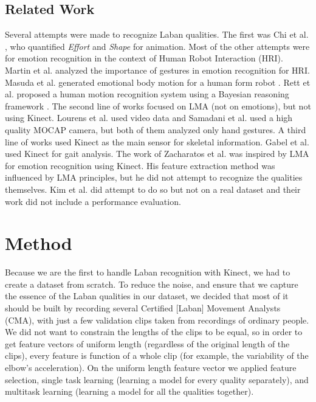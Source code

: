 \documentclass[11pt,twocolumn,varwidth=true,a4paper,fleqn]{article}
\begin{document}
\subsection{Related Work}
Several attempts were made to recognize Laban qualities. The first was Chi et al. \cite{chi2000emote}, who quantified \textit{Effort} and \textit{Shape} for animation. Most of the other attempts were for emotion recognition in the context of Human Robot Interaction (HRI). Martin et al. \cite{martin} analyzed the importance of gestures in emotion recognition for HRI. Masuda et al. generated emotional body motion for a human 
form robot \cite{Masuda}. Rett et al. proposed a human motion recognition 
system using a Bayesian reasoning framework \cite{Rett}. The second line of works focused on LMA (not on emotions), but not using Kinect. Lourens et al. \cite{lourens2010communicating} used video data and Samadani et al.
\cite{samadani2013laban} used a high quality MOCAP camera, but both of them
analyzed only hand gestures. A third line of works used Kinect as the main
sensor for skeletal information. Gabel et al.
\cite{gabel2012full} used Kinect for gait analysis. The work of
Zacharatos et al. \cite{Zacharatos} was inspired by LMA for emotion recognition using Kinect. His feature extraction method was influenced by LMA principles, but he did not attempt to recognize the qualities themselves. Kim et al. \cite{kim} did attempt to do so but not on a real dataset and their work did not include a performance evaluation.

\section{Method}
Because we are the first to handle Laban recognition with
Kinect, we had to create a dataset from scratch. To reduce the noise, and ensure that we capture the essence of the Laban qualities in our dataset, we decided that most of it should be built by recording several Certified [Laban] Movement Analysts (CMA), with just a few validation clips taken from recordings of ordinary people. We did not want to constrain the lengths of the clips to be equal, so in order to get feature vectors of uniform length (regardless of the original length of the clips),
every feature is function of a whole clip (for example, the variability of the
elbow's acceleration). On the uniform length feature vector we applied feature
selection, single task learning (learning a model for every quality separately),
and multitask learning (learning a model for all the qualities together).
\end{document}
